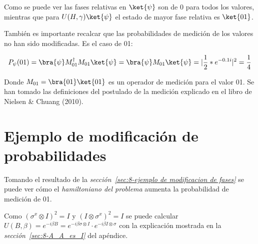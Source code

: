 Como se puede ver las fases relativas  %
en $\ket{\psi}$ son de 0 para todos los valores, mientras que para $U(H, \gamma) \ket{\psi}$ el estado de mayor fase relativa es $\ket{01}$.

También es importante recalcar que las probabilidades de medición de los valores no han sido modificadas. Es el caso de 01:

\begin{align*}
  P_{\psi}(01) = \bra{\psi}M_{01}^\dagger M_{01}\ket{\psi} = \bra{\psi}M_{01}\ket{\psi} = |\frac{1}{2}*e^{-0.1i}|^2 = \frac{1}{4}
\end{align*}

Donde $M_{01} = \bra{01}\ket{01}$ es un operador de medición para el valor 01.
Se han tomado las definiciones del postulado de la medición explicado en el libro de Nielsen \& Chuang (2010)\cite{Nielsen_Chuang_2010}.


\section{Ejemplo de modificación de probabilidades}
Tomando el resultado de la \textit{sección~\ref{sec:8-ejemplo de modificacion de fases}} se puede ver cómo el \textit{hamiltoniano del problema} aumenta la probabilidad de medición de 01.

Como ${(\sigma^x \otimes I)}^2 = I$ y ${(I \otimes \sigma^x)}^2 = I$ se puede calcular $U(B, \beta) = e^{-i \beta B} = e^{-i \beta \sigma \otimes I} \cdot e^{-i \beta I \otimes \sigma}$ con la explicación mostrada en la \textit{sección~\ref{sec:8-A_A_es_I}} del apéndice.


